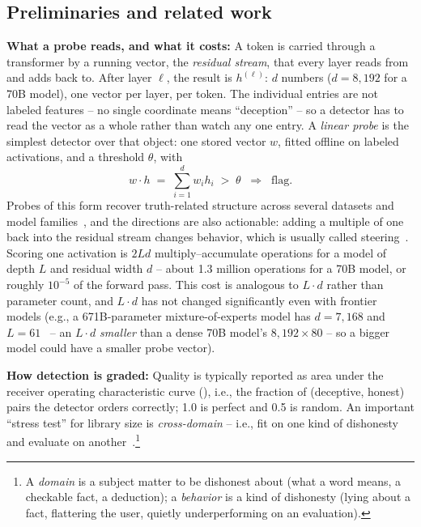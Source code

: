 \subsection{Preliminaries and related work}
\label{subsec:Probes}
\label{subsec:RelatedWork}
\textbf{What a probe reads, and what it costs:} A token is carried
through a transformer by a running vector, the \emph{residual stream},
that every layer reads from and adds back to. After layer $\ell$,
the result is $h^{(\ell)}$: $d$ numbers ($d=8{,}192$ for a 70B
model), one vector per layer, per token. The individual entries are
not labeled features -- no single coordinate means ``deception'' --
so a detector has to read the vector as a whole rather than watch any
one entry. A \emph{linear probe} is the simplest detector over
that object: one stored vector $w$, fitted offline on labeled
activations, and a threshold $\theta$, with
%
\begin{equation}
w \cdot h \;=\; \sum_{i=1}^{d} w_i h_i \;>\; \theta
\;\;\Longrightarrow\;\; \text{flag.}
\label{eq:probe}
\end{equation}
%
Probes of this form recover truth-related structure across several
datasets and model families~\cite{marks2023geometry,burns2023ccs,
zou2023repe}, and the directions are also actionable: adding a multiple
of one back into the residual stream changes behavior, which is usually
called steering~\cite{zou2023repe}. Scoring one activation is $2Ld$ multiply--accumulate
operations for a model of depth $L$ and residual width $d$ -- about
1.3 million operations for a 70B model, or roughly $10^{-5}$ of the
forward pass. This cost is analogous to $L\!\cdot\!d$ rather than
parameter count, and $L\!\cdot\!d$ has not changed significantly
even with frontier models (e.g., a 671B-parameter mixture-of-experts
model has $d=7{,}168$ and $L=61$~\cite{deepseekv3} -- an
$L\!\cdot\!d$ \emph{smaller} than a dense 70B model's
$8{,}192\times80$ -- so a bigger model could have a smaller probe
vector).

\textbf{How detection is graded:} Quality is typically reported as area
under
the receiver operating characteristic curve (\auroc), i.e., the
fraction of (deceptive, honest) pairs the detector orders correctly;
1.0 is perfect and 0.5 is random. An important ``stress test''
for library size is \emph{cross-domain} -- i.e., fit on one kind of
dishonesty and evaluate on another~\cite{ying2026spectrum}.\footnote{A
\emph{domain} is a subject matter to be dishonest about (what a word
means, a checkable fact, a deduction); a \emph{behavior} is a kind of
dishonesty (lying about a fact, flattering the user, quietly
underperforming on an evaluation).}

